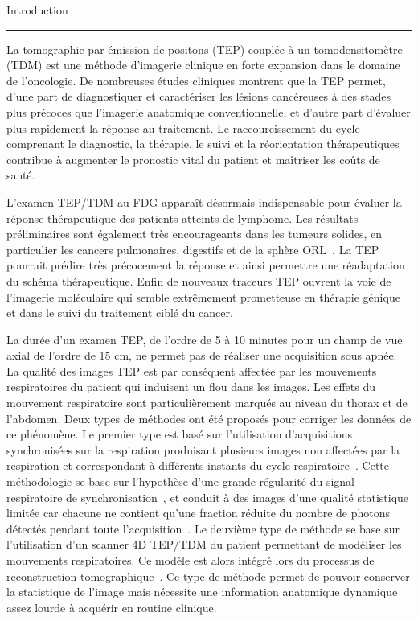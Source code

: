 
{\fontsize{30}{100}\selectfont Introduction}

\rule{15cm}{0.1em}

\vspace{1cm}
\thispagestyle{plain}

La tomographie par émission de positons (TEP) couplée à un tomodensitomètre (TDM) est une méthode d’imagerie clinique en forte expansion dans le domaine de l’oncologie. De nombreuses études cliniques montrent que la TEP permet, d’une part de diagnostiquer et caractériser les lésions cancéreuses à des stades plus précoces que l’imagerie anatomique conventionnelle, et d’autre part d’évaluer plus rapidement la réponse au traitement. Le raccourcissement du cycle comprenant le diagnostic, la thérapie, le suivi et la réorientation thérapeutiques contribue à augmenter le pronostic vital du patient et maîtriser les coûts de santé.

L’examen TEP/TDM au FDG apparaît désormais indispensable pour évaluer la réponse thérapeutique des patients atteints de lymphome. Les résultats préliminaires sont également très encourageants dans les tumeurs solides, en particulier les cancers pulmonaires, digestifs et de la sphère ORL~\cite{cachin2006evaluation}. La TEP pourrait prédire très précocement la réponse et ainsi permettre une réadaptation du schéma thérapeutique. Enfin de nouveaux traceurs TEP ouvrent la voie de l’imagerie moléculaire qui semble extrêmement prometteuse en thérapie génique et dans le suivi du traitement ciblé du cancer.

La durée d’un examen TEP, de l’ordre de 5 à 10 minutes pour un champ de vue axial de l’ordre de 15 cm, ne permet pas de réaliser une acquisition sous apnée. La qualité des images TEP est par conséquent affectée par les mouvements respiratoires du patient qui induisent un flou dans les images. Les effets du mouvement respiratoire sont particulièrement marqués au niveau du thorax et de l’abdomen. Deux types de méthodes ont été proposés pour corriger les données de ce phénomène. Le premier type est basé sur l’utilisation d’acquisitions synchronisées sur la respiration produisant plusieurs images non affectées par la respiration et correspondant à différents instants du cycle respiratoire~\cite{nehmeh2002effect}\cite{boucher2004respiratory}. Cette méthodologie se base sur l’hypothèse  d’une grande régularité du signal respiratoire de synchronisation~\cite{boucher2004respiratory}, et conduit à des images d’une qualité statistique limitée car chacune ne contient qu'une fraction réduite du nombre de photons détectés pendant toute l’acquisition~\cite{visvikis2004evaluation}. Le deuxième type de méthode se base sur l’utilisation d’un scanner 4D TEP/TDM du patient permettant de modéliser les mouvements respiratoires. Ce modèle est alors intégré lors du processus de reconstruction tomographique~\cite{lamare2007list}. Ce type de méthode permet de pouvoir conserver la statistique de l’image mais nécessite une information anatomique dynamique assez lourde à acquérir en routine clinique.

